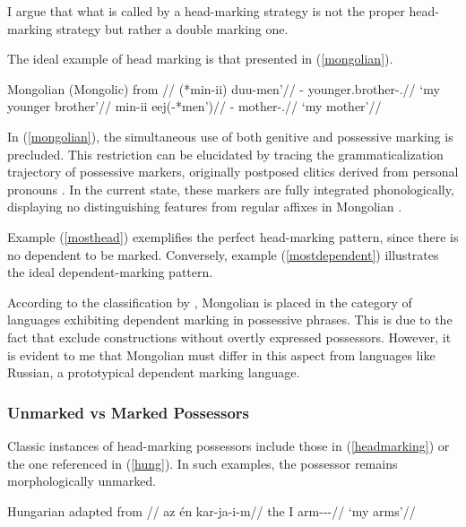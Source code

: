 I argue that what is called by \cite{nichols_locus_2013,lander2020head} a head-marking strategy is not the proper head-marking strategy but rather a double marking one.

The ideal example of head marking is that presented in (\ref{mongolian}).

\pex\label{mongolian}
\glpreamble Mongolian (Mongolic) from \cite{janhunen_mongolian_2012}//
\a\label{mosthead}
\begingl
\gla (*min-ii) duu-men'//
\glb \Fsg-\Gen{} younger.brother-\Poss.\First//
\glft `my younger brother'//
\endgl
\a
\begingl\label{mostdependent}
\gla min-ii eej(-*men')//
\glb \Fsg-\Gen{} mother-\Poss.\First//
\glft `my mother'//
\endgl
\xe

In (\ref{mongolian}), the simultaneous use of both genitive and possessive marking is precluded. This restriction can be elucidated by tracing the grammaticalization trajectory of possessive markers, originally postposed clitics derived from personal pronouns \citep{brosig2018}. In the current state, these markers are fully integrated phonologically, displaying no distinguishing features from regular affixes in Mongolian \citep[137]{janhunen_mongolian_2012}.

Example (\ref{mosthead}) exemplifies the perfect head-marking pattern, since there is no dependent to be marked. Conversely, example (\ref{mostdependent}) illustrates the ideal dependent-marking pattern.

According to the classification by \cite{nichols_locus_2013}, Mongolian is placed in the category of languages exhibiting dependent marking in possessive phrases. This is due to the fact that \cite{nichols_locus_2013} exclude constructions without overtly expressed possessors. However, it is evident to me that Mongolian must differ in this aspect from languages like Russian, a prototypical dependent marking language.

\subsubsection{Unmarked vs Marked Possessors}

\label{subsec:marking}

Classic instances of head-marking possessors include those in (\ref{headmarking}) or the one referenced in (\ref{hung}). In such examples, the possessor remains morphologically unmarked.

\ex\label{hung}
\begingl
\glpreamble Hungarian adapted from \cite[263]{szabolcsi1981possessive}//
    \gla az én kar-ja-i-m//
    \glb the I arm-\Poss-\Pl-\Fsg//
    \glft `my arms'//
\endgl
\xe


